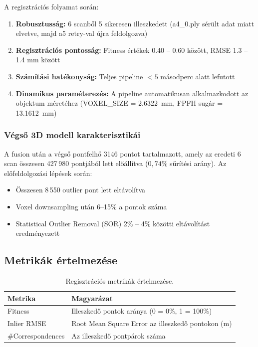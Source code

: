 \documentclass[12pt,a4paper]{article}
\begin{document}
A regisztrációs folyamat során:

\begin{enumerate}[nosep]
    \item \textbf{Robusztusság:} 6 scanből 5 sikeresen illeszkedett (a4\_0.ply sérült adat miatt elvetve, majd a5 retry-val újra feldolgozva)
    \item \textbf{Regisztrációs pontosság:} Fitness értékek 0.40 -- 0.60 között, RMSE 1.3 -- 1.4 mm között
    \item \textbf{Számítási hatékonyság:} Teljes pipeline $< 5$ másodperc alatt lefutott
    \item \textbf{Dinamikus paraméterezés:} A pipeline automatikusan alkalmazkodott az objektum méretéhez (VOXEL\_SIZE = 2.6322~mm, FPFH sugár = 13.1612~mm)
\end{enumerate}

\subsubsection{Végső 3D modell karakterisztikái}

A fusion után a végső pontfelhő 3146 pontot tartalmazott, amely az eredeti 6 scan összesen 427\,980 pontjából lett előállítva ($0{,}74\%$ sűrítési arány). Az előfeldolgozási lépések során:

\begin{itemize}[nosep]
    \item Összesen 8\,550 outlier pont lett eltávolítva
    \item Voxel downsampling után 6--15\% a pontok száma
    \item Statistical Outlier Removal (SOR) 2\% -- 4\% közötti eltávolítást eredményezett
\end{itemize}

\subsection{Metrikák értelmezése}

\begin{table}[H]
\centering
\begin{tabular}{ll}
\toprule
\textbf{Metrika} & \textbf{Magyarázat} \\
\midrule
Fitness & Illeszkedő pontok aránya (0 = 0\%, 1 = 100\%) \\
Inlier RMSE & Root Mean Square Error az illeszkedő pontokon (m) \\
\#Correspondences & Az illeszkedő pontpárok száma \\
\bottomrule
\end{tabular}
\caption{Regisztrációs metrikák értelmezése.}
\end{table}
\end{document}
